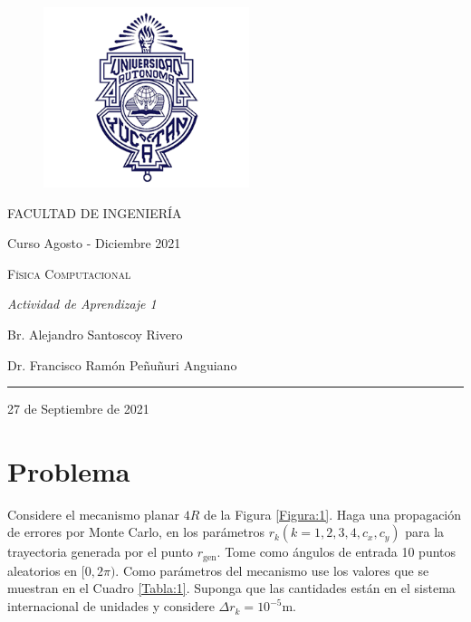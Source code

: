 \documentclass[a4paper, 12pt]{article}
\begin{document}
    \begin{center}
        \begin{Large}

            \begin{figure}[H]	
                \centering
                \includegraphics[width = 6cm]{./img/logo_UADY.png}
                \label{uady}
            \end{figure}
            \textsc{FACULTAD DE INGENIERÍA}
                
            \medskip

            Curso Agosto - Diciembre 2021

            \medskip

            \textsc{Física Computacional}

            \medskip

            \textsl{Actividad de Aprendizaje 1}

            \medskip

            Br. Alejandro Santoscoy Rivero

            \medskip

            Dr. Francisco Ramón Peñuñuri Anguiano

            \rule{0.3\paperwidth}{0.5pt}

            \medskip

            27 de Septiembre de 2021

        \end{Large}
    \end{center}
    \newpage

    \section{Problema}

    Considere el mecanismo planar $4R$ de la Figura \ref{Figura:1}. Haga una propagación de errores por Monte Carlo, en los parámetros $r_k (k = 1, 2, 3, 4, c_x, c_y)$ para la trayectoria generada por el punto $r_\text{gen}$. Tome como ángulos de entrada 10 puntos aleatorios en $[0, 2\pi)$. Como parámetros del mecanismo use los valores que se muestran en el Cuadro \ref{Tabla:1}. Suponga que las cantidades están en el sistema internacional de unidades y considere $\Delta r_k = 10^{-5} \text{m}$.
\end{document}
